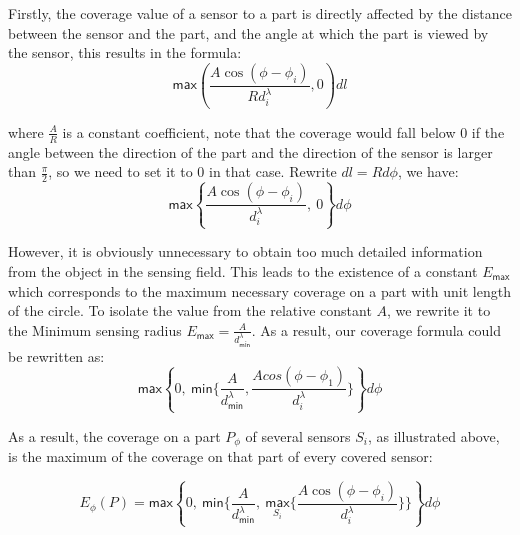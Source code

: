 Firstly, the coverage value of a sensor to a part is directly affected by the distance between the sensor and the part, and the angle at which the part is viewed by the sensor, this results in the formula:
\begin{equation}
\label{eq1}
\mathsf{max}(\frac{A\cos(\phi - \phi_i)}{Rd_i^\lambda}, 0)dl
\end{equation}


where $\frac{A}{R}$ is a constant coefficient, note that the coverage would fall below 0 if the angle between the direction of the part and the direction of the sensor is larger than $\frac{\pi}{2}$, so we need to set it to 0 in that case. Rewrite $dl = Rd\phi$, we have:
\begin{equation}
\label{eq2}
\mathsf{max}\left\{\frac{A\cos(\phi - \phi_i)}{d_i^\lambda},\ 0\right\}d\phi
\end{equation}

However, it is obviously unnecessary to obtain too much detailed information from the object in the sensing field. This leads to the existence of a constant $E_{\mathsf{max}}$ which corresponds to the maximum necessary coverage on a part with unit length of the circle. To isolate the value from the relative constant $A$, we rewrite it to the Minimum sensing radius $E_{\mathsf{max}} = \frac{A}{d_{\mathsf{min}}^\lambda}$. As a result, our coverage formula could be rewritten as:
\begin{equation}
\label{eq3}
\mathsf{max}\left\{0,\ \mathsf{min}\Big\{\frac{A}{d_{\mathsf{min}}^\lambda}, \frac{Acos(\phi - \phi_1)}{d_i^\lambda}\Big\}\right\}d\phi
\end{equation}

As a result, the coverage on a part $P_\phi$ of several sensors $S_i$, as illustrated above, is the maximum of the coverage on that part of every covered sensor:

\begin{equation}
\label{eq4}
E_\phi(P) = \mathsf{max}\left\{0,\ \mathsf{min}\Big\{\frac{A}{d_{\mathsf{min}}^\lambda},\ \underset{S_i}{\mathsf{max}}\big\{\frac{A\cos(\phi - \phi_i)}{d_i^\lambda}\big\}\Big\}\right\}d\phi
\end{equation}

